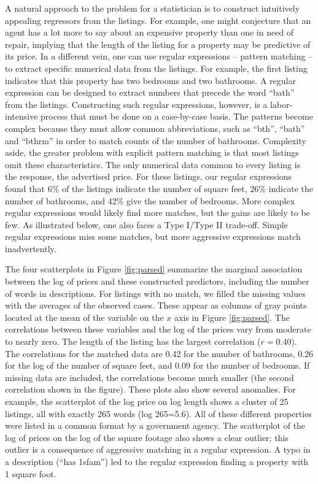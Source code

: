 \documentclass[10pt]{article}
\begin{document}
  
 A natural approach to the problem for a statistician is to construct
 intuitively appealing regressors from the listings.  For example, one might
 conjecture that an agent has a lot more to say about an expensive property than
 one in need of repair, implying that the length of the listing for a property
 may be predictive of its price.  In a different vein, one can use regular
 expressions -- pattern matching -- to extract specific numerical data from the
 listings.  For example, the first listing indicates that this property has two
 bedrooms and two bathrooms.  A regular expression can be designed to extract
 numbers that precede the word ``bath'' from the listings.  Constructing such
 regular expressions, however, is a labor-intensive process that must be done on
 a case-by-case basis.  The patterns become complex because they must allow
 common abbreviations, such as ``bth'', ``bath'' and ``bthrm'' in order to match
 counts of the number of bathrooms.  Complexity aside, the greater problem with
 explicit pattern matching is that most listings omit these characteristics.
  The only numerical data common to every listing is the response, the
 advertised price.  For these listings, our regular expressions found that 6\%
 of the listings indicate the number of square feet, 26\% indicate the number of
 bathrooms, and 42\% give the number of bedrooms.  More complex regular
 expressions would likely find more matches, but the gains are likely to be few.
  As illustrated below, one also faces a Type I/Type II trade-off.  Simple
 regular expressions miss some matches, but more aggressive expressions match
 inadvertently.


 The four scatterplots in Figure \ref{fig:parsed} summarize the marginal
 association between the log of prices and these constructed predictors,
 including the number of words in descriptions.  For listings with no match, we
 filled the missing values with the averages of the observed cases.  These
 appear as columns of gray points located at the mean of the variable on the $x$
 axis in Figure \ref{fig:parsed}.  The correlations between these variables and
 the log of the prices vary from moderate to nearly zero.  The length of the
 listing has the largest correlation ($r=0.40$). The correlations for the
 matched data are 0.42 for the number of bathrooms, 0.26 for the log of the
 number of square feet, and 0.09 for the number of bedrooms.  If missing data
 are included, the correlations become much smaller (the second correlation
 shown in the figure).  These plots also show several anomalies.  For example,
 the scatterplot of the log price on log length shows a cluster of 25 listings,
 all with exactly 265 words (log 265=5.6).  All of these different properties
 were listed in a common format by a government agency.  The scatterplot of the
 log of prices on the log of the square footage also shows a clear outlier; this
 outlier is a consequence of aggressive matching in a regular expression.  A
 typo in a description (``has 1sfam'') led to the regular expression finding a
 property with 1 square foot.
\end{document}
